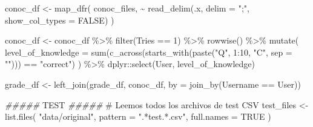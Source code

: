 \documentclass[
  12pt,
  a4paper,
  extrafontsizes,
  onecolumn,
  openright]{memoir}
\newenvironment{Shaded}{\begin{snugshade}}{\end{snugshade}}
\newcommand{\AlertTok}[1]{\textcolor[rgb]{0.68,0.00,0.00}{#1}}
\newcommand{\AttributeTok}[1]{\textcolor[rgb]{0.40,0.45,0.13}{#1}}
\newcommand{\CommentTok}[1]{\textcolor[rgb]{0.37,0.37,0.37}{#1}}
\newcommand{\ConstantTok}[1]{\textcolor[rgb]{0.56,0.35,0.01}{#1}}
\newcommand{\DecValTok}[1]{\textcolor[rgb]{0.68,0.00,0.00}{#1}}
\newcommand{\DocumentationTok}[1]{\textcolor[rgb]{0.37,0.37,0.37}{\textit{#1}}}
\newcommand{\FunctionTok}[1]{\textcolor[rgb]{0.28,0.35,0.67}{#1}}
\newcommand{\NormalTok}[1]{\textcolor[rgb]{0.00,0.23,0.31}{#1}}
\newcommand{\OtherTok}[1]{\textcolor[rgb]{0.00,0.23,0.31}{#1}}
\newcommand{\SpecialCharTok}[1]{\textcolor[rgb]{0.37,0.37,0.37}{#1}}
\newcommand{\StringTok}[1]{\textcolor[rgb]{0.13,0.47,0.30}{#1}}
\begin{document}
\begin{Shaded}
\begin{Highlighting}[]
\NormalTok{conoc\_df }\OtherTok{\textless{}{-}} \FunctionTok{map\_dfr}\NormalTok{(}
\NormalTok{    conoc\_files, }\SpecialCharTok{\textasciitilde{}} \FunctionTok{read\_delim}\NormalTok{(.x, }\AttributeTok{delim =} \StringTok{";"}\NormalTok{, }\AttributeTok{show\_col\_types =} \ConstantTok{FALSE}\NormalTok{)}
\NormalTok{)}

\NormalTok{conoc\_df }\OtherTok{\textless{}{-}}\NormalTok{ conoc\_df }\SpecialCharTok{\%\textgreater{}\%}
    \FunctionTok{filter}\NormalTok{(Tries }\SpecialCharTok{==} \DecValTok{1}\NormalTok{) }\SpecialCharTok{\%\textgreater{}\%}
    \FunctionTok{rowwise}\NormalTok{() }\SpecialCharTok{\%\textgreater{}\%}
    \FunctionTok{mutate}\NormalTok{(}
        \AttributeTok{level\_of\_knowledge =} 
            \FunctionTok{sum}\NormalTok{(}\FunctionTok{c\_across}\NormalTok{(}\FunctionTok{starts\_with}\NormalTok{(}\FunctionTok{paste}\NormalTok{(}\StringTok{"Q"}\NormalTok{, }\DecValTok{1}\SpecialCharTok{:}\DecValTok{10}\NormalTok{, }\StringTok{"C"}\NormalTok{, }\AttributeTok{sep =} \StringTok{""}\NormalTok{))) }\SpecialCharTok{==} \StringTok{"correct"}\NormalTok{)}
\NormalTok{    ) }\SpecialCharTok{\%\textgreater{}\%}
\NormalTok{    dplyr}\SpecialCharTok{::}\FunctionTok{select}\NormalTok{(User, level\_of\_knowledge)}

\NormalTok{grade\_df }\OtherTok{\textless{}{-}} \FunctionTok{left\_join}\NormalTok{(grade\_df, conoc\_df, }\AttributeTok{by =} \FunctionTok{join\_by}\NormalTok{(Username }\SpecialCharTok{==}\NormalTok{ User))}

\DocumentationTok{\#\#\#\#\# }\AlertTok{TEST}\DocumentationTok{ \#\#\#\#\#}
\CommentTok{\# Leemos todos los archivos de test CSV}
\NormalTok{test\_files }\OtherTok{\textless{}{-}} \FunctionTok{list.files}\NormalTok{(}
    \StringTok{"data/original"}\NormalTok{, }\AttributeTok{pattern =} \StringTok{".*test.*.csv"}\NormalTok{, }\AttributeTok{full.names =} \ConstantTok{TRUE}
\NormalTok{)}


\end{Highlighting}
\end{Shaded}
\end{document}
